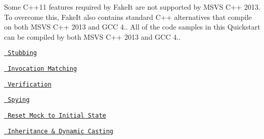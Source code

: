 Some C++11 features required by Fake\+It are not supported by M\+S\+VS C++ 2013. To overcome this, Fake\+It also contains standard C++ alternatives that compile on both M\+S\+VS C++ 2013 and G\+CC 4.. All of the code samples in this Quickstart can be compiled by both M\+S\+VS C++ 2013 and G\+CC 4..


\begin{DoxyItemize}
\item \href{\#stubbing}{\texttt{ Stubbing}}
\item \href{\#invocation-matching}{\texttt{ Invocation Matching}}
\item \href{\#verification}{\texttt{ Verification}}
\item \href{\#spying}{\texttt{ Spying}}
\item \href{\#reset-mock-to-initial-state}{\texttt{ Reset Mock to Initial State}}
\item \href{\#inheritance--dynamic-casting}{\texttt{ Inheritance \& Dynamic Casting}}
\end{DoxyItemize}

